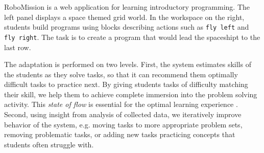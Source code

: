 
%
  {RoboMission is a web application for learning introductory programming.
   The left panel displays a space themed grid world. In the workspace on
   the right, students build programs using blocks describing actions
   such as \texttt{fly left} and \texttt{fly right}.
   The task is to create a program that would lead the spaceshipt to the last row.}

The adaptation is performed on two levels. %
First, the system estimates skills of the students as they solve tasks,
so that it can recommend them optimally difficult tasks to practice next.
By giving students tasks of difficulty matching their skill,
we help them to achieve complete immersion into the problem solving
activity. %
This \emph{state of flow} \cite{flow}
is essential for the optimal learning experience
\cite{adaptive-practice}.
Second, using insight from analysis of collected data,
we iteratively improve behavior of the system,
e.g. moving tasks to more appropriate problem sets,
removing problematic tasks,
or adding new tasks practicing concepts that students often struggle with.





